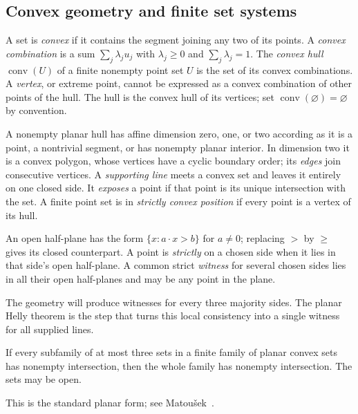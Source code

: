 \subsection{Convex geometry and finite set systems}

\begin{definition}\label{def:convex-geometry}
A set is \emph{convex} if it contains the segment joining any two
of its points. A \emph{convex combination} is a sum
$\sum_j\lambda_j u_j$ with $\lambda_j\ge0$ and
$\sum_j\lambda_j=1$. The \emph{convex hull}
$\operatorname{conv}(U)$ of a finite nonempty point set $U$ is the set of
its convex combinations. A \emph{vertex}, or extreme point, cannot
be expressed as a convex combination of other points of the hull.
The hull is the convex hull of its vertices; set
$\operatorname{conv}(\varnothing)=\varnothing$ by convention.

A nonempty planar hull has affine dimension zero, one, or two according
as it is a point, a nontrivial segment, or has nonempty planar
interior. In dimension two it is a convex polygon, whose vertices
have a cyclic boundary order; its \emph{edges} join consecutive
vertices. A \emph{supporting line} meets a convex set and leaves
it entirely on one closed side. It \emph{exposes} a point if that
point is its unique intersection with the set. A finite point
set is in \emph{strictly convex position} if every point is a
vertex of its hull.
\end{definition}

An open half-plane has the form $\{x:a\cdot x>b\}$ for $a\ne0$;
replacing $>$ by $\ge$ gives its closed counterpart. A point is
\emph{strictly} on a chosen side when it lies in that side's open
half-plane. A common strict \emph{witness} for several chosen sides
lies in all their open half-planes and may be any point in the plane.

The geometry will produce witnesses for every three majority sides.
The planar Helly theorem is the step that turns this local consistency
into a single witness for all supplied lines.

\begin{theorem}\label{thm:helly}
If every subfamily of at most three
sets in a finite family of planar convex sets has nonempty
intersection, then the whole family has nonempty intersection.
The sets may be open.
\end{theorem}
This is the standard planar form; see Matou\v{s}ek~\cite{matousek2002}.

